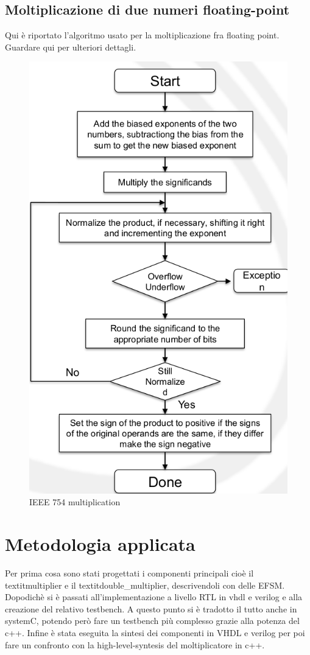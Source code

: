 \documentclass[]{IEEEtran}
\begin{document}
\subsection{Moltiplicazione di due numeri floating-point}
Qui è riportato l'algoritmo usato per la moltiplicazione fra floating point. Guardare qui per ulteriori dettagli\cite{IEE754Mult}.
\begin{figure}[!htb]
    \centering
    \includegraphics[width=0.6\linewidth]{figures/ieee_multiplication.png}
    \caption{IEEE 754 multiplication}
    \label{fig:IEEE_multiplication}
\end{figure}



\section{Metodologia applicata}
Per prima cosa sono stati progettati i componenti principali cioè il textit{multiplier} e il textit{double\_multiplier}, descrivendoli con delle EFSM. Dopodichè si è passati all'implementazione a livello RTL in vhdl e verilog e alla creazione del relativo testbench. A questo punto si è tradotto il tutto anche in systemC, potendo però fare un testbench più complesso grazie alla potenza del c++. Infine è stata eseguita la sintesi dei componenti in VHDL e verilog per poi fare un confronto con la high-level-syntesis del moltiplicatore in c++.
\end{document}

